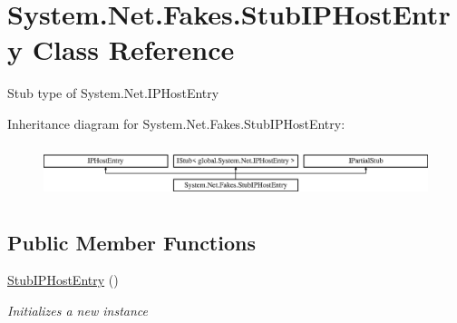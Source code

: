 \hypertarget{class_system_1_1_net_1_1_fakes_1_1_stub_i_p_host_entry}{\section{System.\-Net.\-Fakes.\-Stub\-I\-P\-Host\-Entry Class Reference}
\label{class_system_1_1_net_1_1_fakes_1_1_stub_i_p_host_entry}
}


Stub type of System.\-Net.\-I\-P\-Host\-Entry 


Inheritance diagram for System.\-Net.\-Fakes.\-Stub\-I\-P\-Host\-Entry\-:\begin{figure}[H]
\begin{center}
\leavevmode
\includegraphics[height=1.536351cm]{class_system_1_1_net_1_1_fakes_1_1_stub_i_p_host_entry}
\end{center}
\end{figure}
\subsection*{Public Member Functions}
\begin{DoxyCompactItemize}
\item 
\hyperlink{class_system_1_1_net_1_1_fakes_1_1_stub_i_p_host_entry_ad7898796edaf9e19746b638df755e7bc}{Stub\-I\-P\-Host\-Entry} ()
\begin{DoxyCompactList}\small\item\em Initializes a new instance\end{DoxyCompactList}\end{DoxyCompactItemize}
